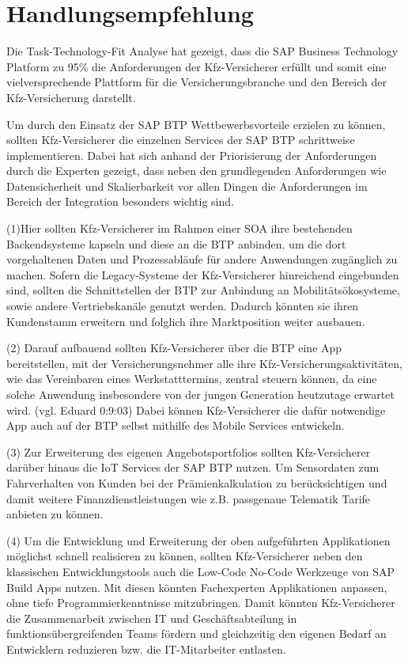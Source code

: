 \chapter{Handlungsempfehlung}

Die Task-Technology-Fit Analyse hat gezeigt, dass die SAP Business Technology Platform zu 95\% die Anforderungen der Kfz-Versicherer erfüllt und somit eine vielversprechende Plattform für die Versicherungsbranche und den Bereich der Kfz-Versicherung darstellt.

Um durch den Einsatz der SAP BTP Wettbewerbsvorteile erzielen zu können, sollten Kfz-Versicherer die einzelnen Services der SAP BTP schrittweise implementieren. Dabei hat sich anhand der Priorisierung der Anforderungen durch die Experten gezeigt, dass neben den grundlegenden Anforderungen wie Datensicherheit und Skalierbarkeit vor allen Dingen die Anforderungen im Bereich der Integration besonders wichtig sind.

(1)Hier sollten Kfz-Versicherer im Rahmen einer SOA ihre bestehenden Backendsysteme kapseln und diese an die BTP anbinden, um die dort vorgehaltenen Daten und Prozessabläufe für andere Anwendungen zugänglich zu machen. Sofern die Legacy-Systeme der Kfz-Versicherer hinreichend eingebunden sind, sollten die Schnittstellen der BTP zur Anbindung an Mobilitätsökosysteme, sowie andere Vertriebskanäle genutzt werden. Dadurch könnten sie ihren Kundenstamm erweitern und folglich ihre Marktposition weiter ausbauen. 

(2) Darauf aufbauend sollten Kfz-Versicherer über die BTP eine App bereitstellen, mit der Versicherungsnehmer alle ihre Kfz-Versicherungsaktivitäten, wie das Vereinbaren eines Werkstatttermins, zentral steuern können, da eine solche Anwendung insbesondere von der jungen Generation heutzutage erwartet wird. (vgl. Eduard 0:9:03)  Dabei können Kfz-Versicherer die dafür notwendige App auch auf der BTP selbst mithilfe des Mobile Services entwickeln.

(3) Zur Erweiterung des eigenen Angebotsportfolios sollten Kfz-Versicherer darüber hinaus die IoT Services der SAP BTP nutzen. Um Sensordaten zum Fahrverhalten von Kunden bei der Prämienkalkulation zu berücksichtigen und damit weitere Finanzdienstleistungen wie z.B. passgenaue Telematik Tarife anbieten zu können.

(4) Um die Entwicklung und Erweiterung der oben aufgeführten Applikationen möglichst schnell realisieren zu können, sollten Kfz-Versicherer neben den klassischen Entwicklungstools auch die Low-Code No-Code Werkzeuge von SAP Build Apps nutzen. Mit diesen könnten Fachexperten Applikationen anpassen, ohne tiefe Programmierkenntnisse mitzubringen. Damit könnten Kfz-Versicherer die Zusammenarbeit zwischen IT und Geschäftsabteilung in funktionsübergreifenden Teams fördern und gleichzeitig den eigenen Bedarf an Entwicklern reduzieren bzw. die IT-Mitarbeiter entlasten.


